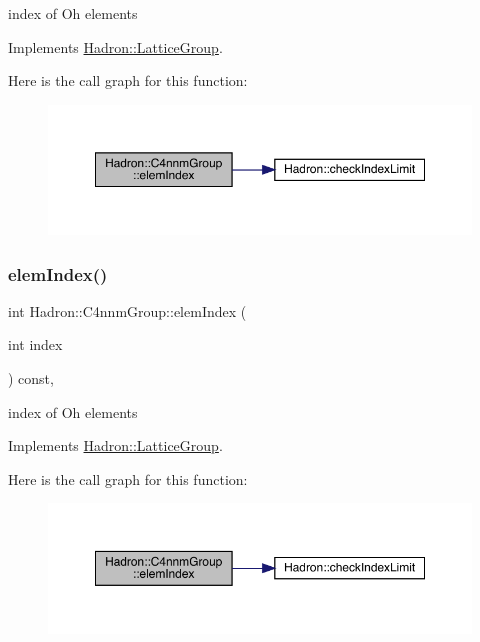 index of Oh elements 

Implements \mbox{\hyperlink{structHadron_1_1LatticeGroup_afb8e3ee60de059f75bce1044c694e1e8}{Hadron\+::\+Lattice\+Group}}.

Here is the call graph for this function\+:
\nopagebreak
\begin{figure}[H]
\begin{center}
\leavevmode
\includegraphics[width=350pt]{d1/dba/structHadron_1_1C4nnmGroup_a8cbcb161ddf801e759797f231db35f75_cgraph}
\end{center}
\end{figure}
\mbox{\label{structHadron_1_1C4nnmGroup_a8cbcb161ddf801e759797f231db35f75}} 
\subsubsection{\texorpdfstring{elemIndex()}{elemIndex()}\hspace{0.1cm}{\footnotesize\ttfamily [3/3]}}
{\footnotesize\ttfamily int Hadron\+::\+C4nnm\+Group\+::elem\+Index (\begin{DoxyParamCaption}\item[{int}]{index }\end{DoxyParamCaption}) const\hspace{0.3cm}{\ttfamily [inline]}, {\ttfamily [virtual]}}

index of Oh elements 

Implements \mbox{\hyperlink{structHadron_1_1LatticeGroup_afb8e3ee60de059f75bce1044c694e1e8}{Hadron\+::\+Lattice\+Group}}.

Here is the call graph for this function\+:
\nopagebreak
\begin{figure}[H]
\begin{center}
\leavevmode
\includegraphics[width=350pt]{d1/dba/structHadron_1_1C4nnmGroup_a8cbcb161ddf801e759797f231db35f75_cgraph}
\end{center}
\end{figure}
\mbox{\label{structHadron_1_1C4nnmGroup_a9f35739dbd3ad6effd0e675d40b5341d}} 

